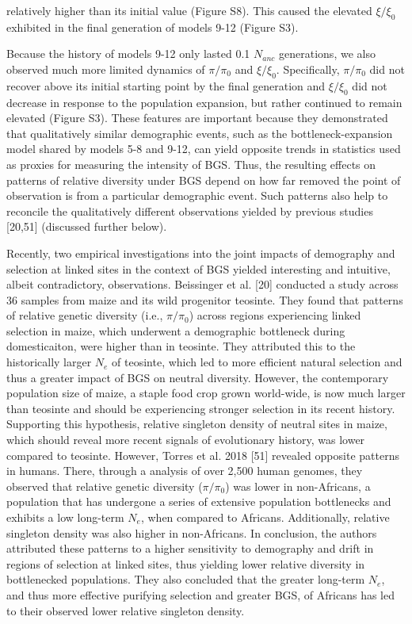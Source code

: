 \documentclass[9pt,twocolumn,twoside]{rilabRxiv}
\begin{document}
relatively higher than its initial value (Figure S8). This caused the
elevated $\xi/\xi_0$ exhibited in the final generation of
models 9-12 (Figure S3).

Because the history of models 9-12 only lasted 0.1
$N_{anc}$ generations, we also observed much more
limited dynamics of $\pi/\pi_0$ and $\xi/\xi_0$.
Specifically, $\pi/\pi_0$ did not recover above its initial
starting point by the final generation and $\xi/\xi_0$ did not
decrease in response to the population expansion, but rather continued
to remain elevated (Figure S3). These features are important because
they demonstrated that qualitatively similar demographic events, such as
the bottleneck-expansion model shared by models 5-8 and 9-12, can yield
opposite trends in statistics used as proxies for measuring the
intensity of BGS. Thus, the resulting effects on patterns of relative
diversity under BGS depend on how far removed the point of observation
is from a particular demographic event. Such patterns also help to
reconcile the qualitatively different observations yielded by previous
studies [20,51] (discussed further below).


Recently, two empirical investigations into the joint impacts of
demography and selection at linked sites in the context of BGS yielded
interesting and intuitive, albeit contradictory, observations.
Beissinger et al. [20] conducted a study across 36 samples from
maize and its wild progenitor teosinte. They found that patterns of
relative genetic diversity (i.e., $\pi/\pi_0$) across regions
experiencing linked selection in maize, which underwent a demographic
bottleneck during domesticaiton, were higher than in teosinte. They
attributed this to the historically larger $N_e$ of
teosinte, which led to more efficient natural selection and thus a
greater impact of BGS on neutral diversity. However, the contemporary
population size of maize, a staple food crop grown world-wide, is now
much larger than teosinte and should be experiencing stronger selection
in its recent history. Supporting this hypothesis, relative singleton
density of neutral sites in maize, which should reveal more recent
signals of evolutionary history, was lower compared to teosinte.
However, Torres et al. 2018 [51] revealed opposite patterns in
humans. There, through a analysis of over 2,500 human genomes, they
observed that relative genetic diversity ($\pi/\pi_0$) was
lower in non-Africans, a population that has undergone a series of
extensive population bottlenecks and exhibits a low long-term
$N_e$, when compared to Africans. Additionally,
relative singleton density was also higher in non-Africans. In
conclusion, the authors attributed these patterns to a higher
sensitivity to demography and drift in regions of selection at linked
sites, thus yielding lower relative diversity in bottlenecked
populations. They also concluded that the greater long-term
$N_e$, and thus more effective purifying selection
and greater BGS, of Africans has led to their observed lower relative
singleton density.
\end{document}
